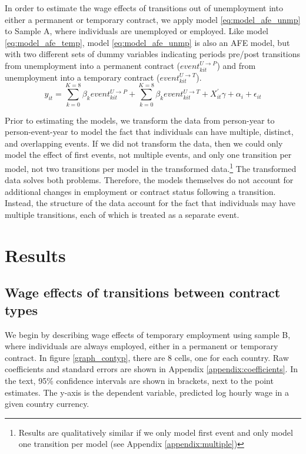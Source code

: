 \documentclass[12pt]{article}
\begin{document}
In order to estimate the wage effects of transitions out of unemployment into either a permanent or temporary contract, we apply model \ref{eq:model_afe_unmp} to Sample A, where individuals are unemployed or employed.   Like model \ref{eq:model_afe_temp}, model \ref{eq:model_afe_unmp} is also an AFE model, but with two different sets of dummy variables indicating periods pre/post transitions from unemployment into a permanent contract ($event^{U \rightarrow P}_{kit}$) and from unemployment into a temporary contract ($event^{U \rightarrow T}_{kit}$).  
\begin{equation}
    y_{it} = \sum^{K=8}_{k=0} \beta_k event^{U \rightarrow P}_{kit} + \sum^{K=8}_{k=0} \beta_k event^{U \rightarrow T}_{kit} + X^\prime_{it} \gamma + \alpha_i + \epsilon_{it}     
    \label{eq:model_afe_unmp}
\end{equation}

Prior to estimating the models, we transform the data from person-year to person-event-year to model the fact that individuals can have multiple, distinct, and overlapping events.  If we did not transform the data, then we could only model the effect of first events, not multiple events, and only one transition per model, not two transitions per model in the transformed data.\footnote{Results are qualitatively similar if we only model first event and only model one transition per model (see Appendix \ref{appendix:multiple})}  The transformed data solves both problems.  Therefore, the models themselves do not account for additional changes in employment or contract status following a transition.  Instead, the structure of the data account for the fact that individuals may have multiple transitions, each of which is treated as a separate event.

\section{Results}

\subsection{Wage effects of transitions between contract types}

We begin by describing wage effects of temporary employment using sample B, where individuals are always employed, either in a permanent or temporary contract.  In figure \ref{graph_contyp}, there are 8 cells, one for each country.  Raw coefficients and standard errors are shown in Appendix \ref{appendix:coefficients}.  In the text, 95\% confidence intervals are shown in brackets, next to the point estimates.  The y-axis is the dependent variable, predicted log hourly wage in a given country currency.  
\end{document}
